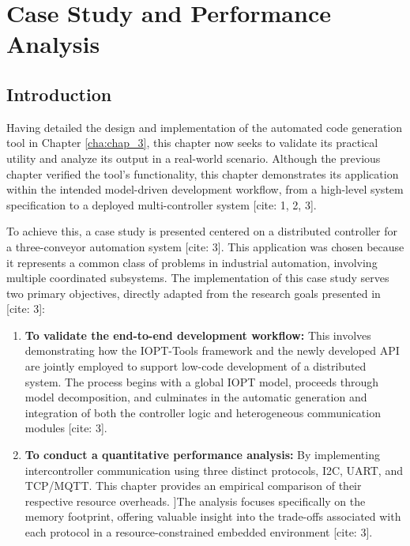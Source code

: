 
%


\chapter{Case Study and Performance Analysis}
\label{cha:case_study}


%

\section{Introduction}
\label{sec:case_study_intro}

Having detailed the design and implementation of the automated code generation tool in Chapter \ref{cha:chap_3}, this chapter now seeks to validate its practical utility and analyze its output in a real-world scenario. Although the previous chapter verified the tool's functionality, this chapter demonstrates its application within the intended model-driven development workflow, from a high-level system specification to a deployed multi-controller system [cite: 1, 2, 3].

To achieve this, a case study is presented centered on a distributed controller for a three-conveyor automation system [cite: 3]. This application was chosen because it represents a common class of problems in industrial automation, involving multiple coordinated subsystems. The implementation of this case study serves two primary objectives, directly adapted from the research goals presented in [cite: 3]:

\begin{enumerate}
    \item \textbf{To validate the end-to-end development workflow:} This involves demonstrating how the IOPT-Tools framework and the newly developed API are jointly employed to support low-code development of a distributed system. The process begins with a global IOPT model, proceeds through model decomposition, and culminates in the automatic generation and integration of both the controller logic and heterogeneous communication modules [cite: 3].
    
    \item \textbf{To conduct a quantitative performance analysis:} By implementing intercontroller communication using three distinct protocols, I2C, UART, and TCP/MQTT. This chapter provides an empirical comparison of their respective resource overheads. ]The analysis focuses specifically on the memory footprint, offering valuable insight into the trade-offs associated with each protocol in a resource-constrained embedded environment [cite: 3].
\end{enumerate}

